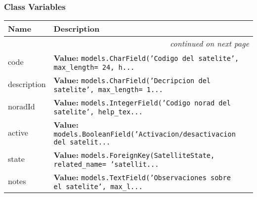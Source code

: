   \subsubsection{Class Variables}

    \vspace{-1cm}
\hspace{\varindent}\begin{longtable}{|p{\varnamewidth}|p{\vardescrwidth}|l}
\cline{1-2}
\cline{1-2} \centering \textbf{Name} & \centering \textbf{Description}& \\
\cline{1-2}
\endhead\cline{1-2}\multicolumn{3}{r}{\small\textit{continued on next page}}\\\endfoot\cline{1-2}
\endlastfoot\raggedright c\-o\-d\-e\- & \raggedright \textbf{Value:} 
{\tt models.CharField('Codigo del satelite', max\_length= 24, h\texttt{...}}&\\
\cline{1-2}
\raggedright d\-e\-s\-c\-r\-i\-p\-t\-i\-o\-n\- & \raggedright \textbf{Value:} 
{\tt models.CharField('Decripcion del satelite', max\_length= 1\texttt{...}}&\\
\cline{1-2}
\raggedright n\-o\-r\-a\-d\-I\-d\- & \raggedright \textbf{Value:} 
{\tt models.IntegerField('Codigo norad del satelite', help\_tex\texttt{...}}&\\
\cline{1-2}
\raggedright a\-c\-t\-i\-v\-e\- & \raggedright \textbf{Value:} 
{\tt models.BooleanField('Activacion/desactivacion del satelit\texttt{...}}&\\
\cline{1-2}
\raggedright s\-t\-a\-t\-e\- & \raggedright \textbf{Value:} 
{\tt models.ForeignKey(SatelliteState, related\_name= 'satellit\texttt{...}}&\\
\cline{1-2}
\raggedright n\-o\-t\-e\-s\- & \raggedright \textbf{Value:} 
{\tt models.TextField('Observaciones sobre el satelite', max\_l\texttt{...}}&\\
\cline{1-2}
\end{longtable}


